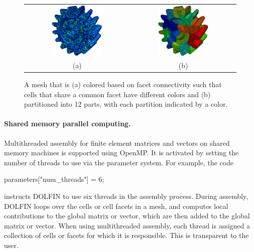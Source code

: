 \begin{figure}
    \center
    \begin{tabular}{cc}
      \includegraphics[width=0.5\textwidth]{chapters/logg-2/png/coloured.png}
      &
      \includegraphics[width=0.5\textwidth]{chapters/logg-2/png/partition.png}
      \\[1ex] (a) & (b)
    \end{tabular}
    \caption{A mesh that is (a) colored based on facet connectivity such
     that cells that share a common facet have different colors and
     (b) partitioned into 12 parts, with each partition indicated by
     a color.}
    \label{fig:logg-2:parallel}
\end{figure}


\paragraph{Shared memory parallel computing.}

Multithreaded assembly for finite element matrices and vectors on shared
memory machines is supported using OpenMP. It is activated by
setting the number of threads to use via the parameter system.
For example, the code
\begin{c++}
parameters["num_threads"] = 6;
\end{c++}
instructs DOLFIN to use six threads in the assembly process.  During
assembly, DOLFIN loops over the cells or cell facets in a mesh, and
computes local contributions to the global matrix or vector, which are
then added to the global matrix or vector. When using multithreaded
assembly, each thread is assigned a collection of cells or facets for
which it is responsible. This is transparent to the user.

